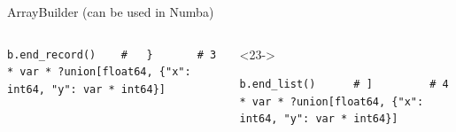 \documentclass[aspectratio=169]{beamer}
\begin{document}
\begin{frame}[fragile]{ArrayBuilder (can be used in Numba)}
\begin{columns}
\begin{uncoverenv}
\begin{verbatim}
b.end_record()    #   }       # 3 * var * ?union[float64, {"x": int64, "y": var * int64}]
\end{verbatim}
\end{uncoverenv}
\vspace{-0.43 cm}
\begin{uncoverenv}<23->
\begin{verbatim}
b.end_list()      # ]         # 4 * var * ?union[float64, {"x": int64, "y": var * int64}]
\end{verbatim}
\end{uncoverenv}
\end{columns}
\end{frame}










\end{document}
